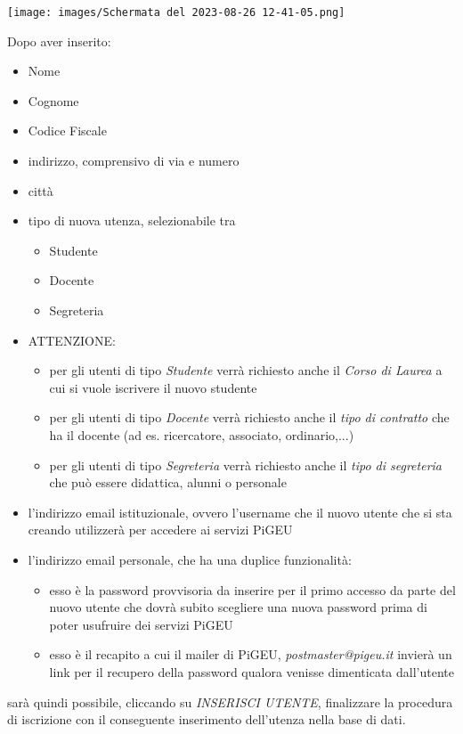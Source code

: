 \documentclass{article}
\newcommand{\danger}[0]{\textcolor{red}{\faExclamationCircle}}
\begin{document}
    \begin{center}
        \texttt{[image: images/Schermata del 2023-08-26 12-41-05.png]}
    \end{center}
    Dopo aver inserito:
    \begin{itemize}
        \item Nome
        \item Cognome
        \item Codice Fiscale
        \item indirizzo, comprensivo di via e numero
        \item città

        \pagebreak

        \item tipo di nuova utenza, selezionabile tra
        \begin{itemize}
            \item Studente
            \item Docente
            \item Segreteria
        \end{itemize}
        \item \danger ATTENZIONE:
        \begin{itemize}
            \item per gli utenti di tipo \textit{Studente} verrà richiesto anche il \textit{Corso di Laurea} a cui si vuole iscrivere il nuovo studente
            \item per gli utenti di tipo \textit{Docente} verrà richiesto anche il \textit{tipo di contratto} che ha il docente (ad es. ricercatore, associato, ordinario,...)
            \item per gli utenti di tipo \textit{Segreteria} verrà richiesto anche il \textit{tipo di segreteria} che può essere didattica, alunni o personale
        \end{itemize}
        \item l'indirizzo email istituzionale, ovvero l'username che il nuovo utente che si sta creando utilizzerà per accedere ai servizi PiGEU
        \item l'indirizzo email personale, che ha una duplice funzionalità:
        \begin{itemize}
            \item esso è la password provvisoria da inserire per il primo accesso da parte del nuovo utente che dovrà subito scegliere una nuova password prima di poter usufruire dei servizi PiGEU
            \item esso è il recapito a cui il mailer di PiGEU, \textit{postmaster@pigeu.it} invierà un link per il recupero della password qualora venisse dimenticata dall'utente
        \end{itemize}
    \end{itemize}
    sarà quindi possibile, cliccando su \textit{INSERISCI UTENTE}, finalizzare la procedura di iscrizione con il conseguente inserimento dell'utenza nella base di dati.
\end{document}
